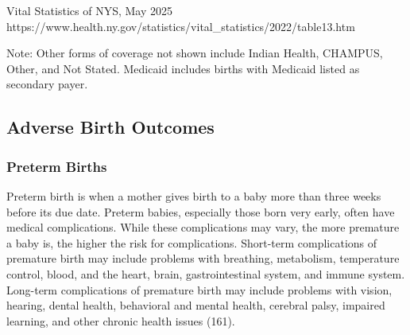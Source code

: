 \documentclass[
  english,
  letterpaper,
]{report}
\begin{document}
\begin{tcolorbox}[enhanced jigsaw, breakable, leftrule=.75mm, title=\textcolor{quarto-callout-note-color}{\faInfo}\hspace{0.5em}{Source}, bottomrule=.15mm, opacityback=0, left=2mm, colback=white, bottomtitle=1mm, coltitle=black, colbacktitle=quarto-callout-note-color!10!white, colframe=quarto-callout-note-color-frame, opacitybacktitle=0.6, toptitle=1mm, titlerule=0mm, arc=.35mm, rightrule=.15mm, toprule=.15mm]

Vital Statistics of NYS, May 2025
https://www.health.ny.gov/statistics/vital\_statistics/2022/table13.htm

\end{tcolorbox}

\begin{tcolorbox}[enhanced jigsaw, breakable, leftrule=.75mm, title=\textcolor{quarto-callout-note-color}{\faInfo}\hspace{0.5em}{Note}, bottomrule=.15mm, opacityback=0, left=2mm, colback=white, bottomtitle=1mm, coltitle=black, colbacktitle=quarto-callout-note-color!10!white, colframe=quarto-callout-note-color-frame, opacitybacktitle=0.6, toptitle=1mm, titlerule=0mm, arc=.35mm, rightrule=.15mm, toprule=.15mm]

Note: Other forms of coverage not shown include Indian Health, CHAMPUS,
Other, and Not Stated. Medicaid includes births with Medicaid listed as
secondary payer.

\end{tcolorbox}

\subsection{Adverse Birth Outcomes}\label{adverse-birth-outcomes}

\subsubsection{Preterm Births}\label{preterm-births}

Preterm birth is when a mother gives birth to a baby more than three
weeks before its due date. Preterm babies, especially those born very
early, often have medical complications. While these complications may
vary, the more premature a baby is, the higher the risk for
complications. Short-term complications of premature birth may include
problems with breathing, metabolism, temperature control, blood, and the
heart, brain, gastrointestinal system, and immune system. Long-term
complications of premature birth may include problems with vision,
hearing, dental health, behavioral and mental health, cerebral palsy,
impaired learning, and other chronic health issues (161).
\end{document}
